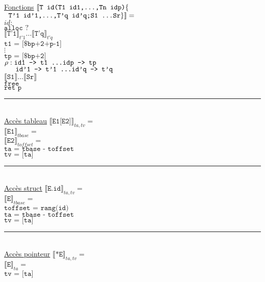 \documentclass[12pt,twocolumn]{report}
\begin{document}
    \underline{Fonctions}
    $\llbracket \texttt{T id(T1 id1,\dots,Tn idp)}\lbrace$\\
    \hphantom{aa} $\texttt{ T'1 id'1,\dots,T'q id'q;S1 \dots Sr}\rbrace \rrbracket= $\\
    $id:$\\
    \hphantom{aaaaaa}$\texttt{alloc ?} $\\
    \hphantom{aaaaaa}$\llbracket \texttt{T'1} \rrbracket_{t'1} \dots\llbracket \texttt{T'q} \rrbracket_{t'q} $\\
    \hphantom{aaaaaa}$\texttt{t1 = [\$bp+2+p-1]}$\\
    \hphantom{aaaaaa}$\vdots$\\
    \hphantom{aaaaaa}$\texttt{tp = [\$bp+2]}$\\
    \hphantom{aaaaaa}$\rho: \texttt{id1 --> t1 \dots idp --> tp}$\\
    \hphantom{aaaaaa}$\hphantom{aaa}\texttt{id'1 --> t'1 \dots id'q --> t'q}$\\
    \hphantom{aaaaaa}$\llbracket \texttt{S1} \rrbracket \dots\llbracket \texttt{Sr} \rrbracket$\\
    \hphantom{aaaaaa}$\texttt{free}$\\
    \hphantom{aaaaaa}$\texttt{ret p}$\\
\rule{9cm}{0.1pt}\\
    \underline{Accès tableau}
    $\llbracket \texttt{E1[E2]} \rrbracket_{ta,tv}= $\\
    $\llbracket \texttt{E1} \rrbracket_{tbase}= $\\
    $\llbracket \texttt{E2} \rrbracket_{toffset}=$\\
    $\texttt{ta = tbase - toffset}$\\
    $\texttt{tv = [ta]}$\\
\rule{9cm}{0.1pt}\\
    \underline{Accès struct}
    $\llbracket \texttt{E.id} \rrbracket_{ta,tv}= $\\
    $\llbracket \texttt{E} \rrbracket_{tbase}= $\\
    $\texttt{toffset = rang(id)}$\\
    $\texttt{ta = tbase - toffset}$\\
    $\texttt{tv = [ta]}$\\ 
\rule{9cm}{0.1pt}\\
    \underline{Accès pointeur}
    $\llbracket \texttt{*E} \rrbracket_{ta,tv}= $\\
    $\llbracket \texttt{E} \rrbracket_{ta}= $\\
    $\texttt{tv = [ta]}$ 
\end{document}
